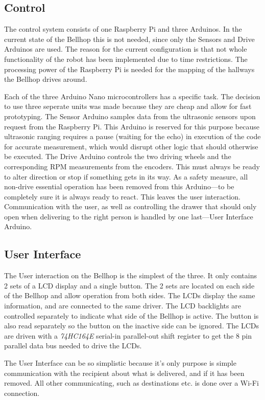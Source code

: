 \documentclass[11pt]{article}
\begin{document}
\subsection*{Control}
The control system consists of one Raspberry Pi and three Arduinos. In the current state of the Bellhop this is not needed, since only the Sensors and Drive Arduinos are used. The reason for the current configuration is that not whole functionality of the robot has been implemented due to time restrictions. The processing power of the Raspberry Pi is needed for the mapping of the hallways the Bellhop drives around.


Each of the three Arduino Nano microcontrollers has a specific task. The decision to use three seperate units was made because they are cheap and allow for fast prototyping. The Sensor Arduino samples data from the ultrasonic sensors upon request from the Raspberry Pi. This Arduino is reserved for this purpose because ultrasonic ranging requires a pause (waiting for the echo) in execution of the code for accurate measurement, which would disrupt other logic that should otherwise be executed. The Drive Arduino controls the two driving wheels and the corresponding RPM measurements from the encoders. This must always be ready to alter direction or stop if something gets in its way. As a safety measure, all non-drive essential operation has been removed from this Arduino---to be completely sure it is always ready to react. This leaves the user interaction. Communication with the user, as well as controlling the drawer that should only open when delivering to the right person is handled by one last---User Interface Arduino.
\subsection*{User Interface}


The User interaction on the Bellhop is the simplest of the three. It only contains 2 sets of a LCD display and a single button. The 2 sets are located on each side of the Bellhop and allow operation from both sides. The LCDs display the same information, and are connected to the same driver. The LCD backlights are controlled separately to indicate what side of the Bellhop is active. The button is also read separately so the button on the inactive side can be ignored. The LCDs are driven with a \textit{74HC164E} serial-in parallel-out shift register to get the 8 pin parallel data bus needed to drive the LCDs.


The User Interface can be so simplistic because it’s only purpose is simple communication with the recipient about what is delivered, and if it has been removed. All other communicating, such as destinations etc. is done over a Wi-Fi connection.
\end{document}
